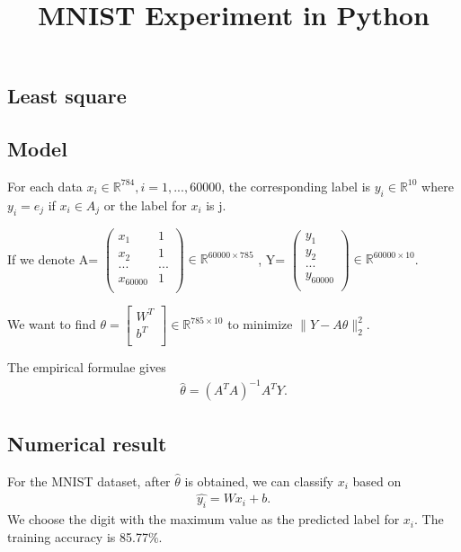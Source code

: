 \documentclass[12pt]{article}
\title{MNIST Experiment in Python}
\begin{document}
\maketitle
\newtheorem{theorem}{Theorem}[section]
\newtheorem{lemma}[theorem]{Lemma}
\newtheorem{proposition}[theorem]{Proposition}
\newtheorem{corollary}[theorem]{Corollary}
\newtheorem{definition}[theorem]{Definition}
\newtheorem{example}[theorem]{Example}
\begin{CJK*}{UTF8}{gbsn}

\section{Least square}
\subsection{Model}
For each data $x_i\in \mathbb{R}^{784}, i=1,...,60000$, the corresponding label is $y_i\in \mathbb{R}^{10}$ where $y_i=e_j$ if $x_i \in A_j$ or the label for $x_i$ is j. 

If we denote 
A=
$\begin{pmatrix}
    x_{1}       & 1 \\
    x_{2}       & 1 \\
    ... &... \\
    x_{60000}       & 1\\
\end{pmatrix} \in \mathbb{R}^{60000\times 785}$ , Y=
$\begin{pmatrix}
    y_{1}        \\
    y_{2}       \\
    ... \\
    y_{60000}     \\
\end{pmatrix}\in \mathbb{R}^{60000\times 10}$.

We want to find $\theta=\left[ {\begin{array}{c}
   W^T \\
   b^T \\
  \end{array} } \right]\in \mathbb{R}^{785\times 10}$ to minimize $\|Y-A\theta\|^2_2$.
  
The empirical formulae gives
\begin{align}
\hat{\theta}=(A^TA)^{-1}A^TY.
\end{align}

\subsection{Numerical result}
For the MNIST dataset, after $\hat{\theta}$ is obtained, we can classify $x_i$ based on 
\begin{align}
\hat{y_i}=Wx_i+b.
\end{align}
We choose the digit with the maximum value as the predicted label for $x_i$. The training accuracy is 85.77$\%$.


\end{CJK*}
\end{document}
